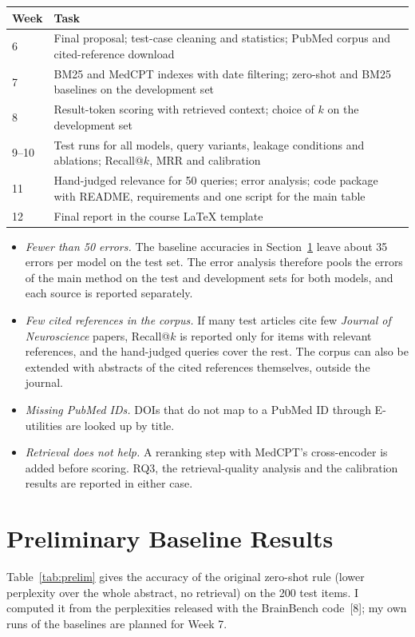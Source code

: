 \documentclass[10pt,a4paper]{article}
\begin{document}
\begin{center}\small
\begin{tabular}{lp{14.2cm}}
\toprule
Week & Task \\
\midrule
6      & Final proposal; test-case cleaning and statistics; PubMed corpus and cited-reference download \\
7      & BM25 and MedCPT indexes with date filtering; zero-shot and BM25 baselines on the development set \\
8      & Result-token scoring with retrieved context; choice of $k$ on the development set \\
9--10  & Test runs for all models, query variants, leakage conditions and ablations; Recall@$k$, MRR and calibration \\
11     & Hand-judged relevance for 50 queries; error analysis; code package with README, requirements and one script for the main table \\
12     & Final report in the course \LaTeX{} template \\
\bottomrule
\end{tabular}
\end{center}

\begin{itemize}
\item \emph{Fewer than 50 errors.} The baseline accuracies in Section~\ref{sec:prelim} leave about 35 errors per model on the test set. The error analysis therefore pools the errors of the main method on the test and development sets for both models, and each source is reported separately.
\item \emph{Few cited references in the corpus.} If many test articles cite few \emph{Journal of Neuroscience} papers, Recall@$k$ is reported only for items with relevant references, and the hand-judged queries cover the rest. The corpus can also be extended with abstracts of the cited references themselves, outside the journal.
\item \emph{Missing PubMed IDs.} DOIs that do not map to a PubMed ID through E-utilities are looked up by title.
\item \emph{Retrieval does not help.} A reranking step with MedCPT's cross-encoder is added before scoring. RQ3, the retrieval-quality analysis and the calibration results are reported in either case.
\end{itemize}

\section{Preliminary Baseline Results}\label{sec:prelim}
Table~\ref{tab:prelim} gives the accuracy of the original zero-shot rule (lower perplexity over the whole abstract, no retrieval) on the 200 test items. I computed it from the perplexities released with the BrainBench code~[8]; my own runs of the baselines are planned for Week 7.
\end{document}
